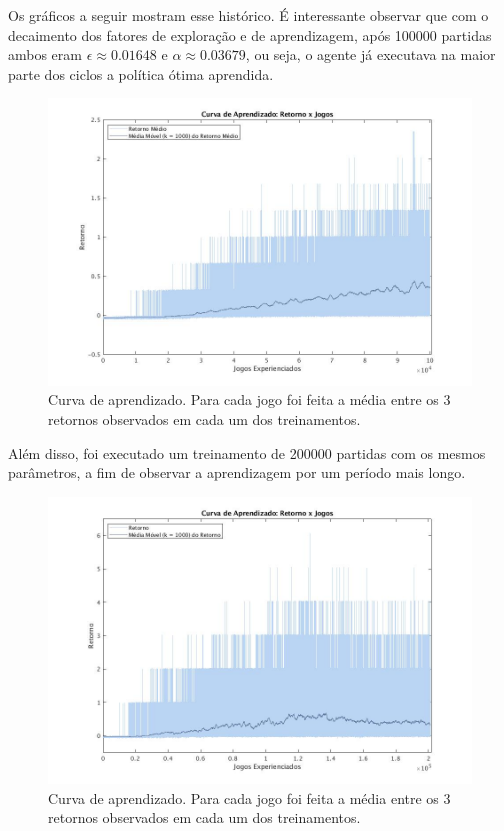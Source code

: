 Os gráficos a seguir mostram esse histórico. É interessante observar que com o decaimento dos fatores de exploração e de aprendizagem, após 100000 partidas ambos eram $\epsilon \approx 0.01648$ e $\alpha \approx 0.03679$, ou seja, o agente já executava na maior parte dos ciclos a política ótima aprendida.

\begin{figure}[h]
	\includegraphics[width=1.0\linewidth]{figs/curva-qtabular.jpg}
	\centering
	\caption{Curva de aprendizado. Para cada jogo foi feita a média entre os 3 retornos observados em cada um dos treinamentos.}
	\label{fig:single-agent-curva}
\end{figure}

Além disso, foi executado um treinamento de 200000 partidas com os mesmos parâmetros, a fim de observar a aprendizagem por um período mais longo.

\begin{figure}[h]
	\includegraphics[width=1.0\linewidth]{figs/curvalonga-qtabular.jpg}
	\centering
	\caption{Curva de aprendizado. Para cada jogo foi feita a média entre os 3 retornos observados em cada um dos treinamentos.}
	\label{fig:single-agent-curvalonga}
\end{figure}

